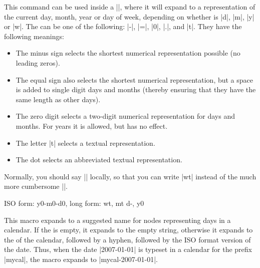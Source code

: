 \begin{command}{\pgfcalendarshorthand{}}
\label{pgfcalendarshorthand}
    This command can be used inside a |\pgfcalendar|, where it will expand to a
    representation of the current day, month, year or day of week, depending on
    whether  is |d|, |m|, |y| or |w|. The  can
    be one of the following: |-|, |=|, |0|, |.|, and |t|. They have the
    following meanings:
    \begin{itemize}
        \item The minus sign selects the shortest numerical representation
            possible (no leading zeros).
        \item The equal sign also selects the shortest numerical
            representation, but a space is added to single digit days and
            months (thereby ensuring that they have the same length as other
            days).
        \item The zero digit selects a two-digit numerical representation for
            days and months. For years it is allowed, but has no effect.
        \item The letter |t| selects a textual representation.
        \item The dot selects an abbreviated textual representation.
    \end{itemize}
    Normally, you should say |\let\%=\pgfcalendarshorthand| locally, so that
    you can write |\%wt| instead of the much more cumbersome
    ||.
\begin{codeexample}
\let\%=\pgfcalendarshorthand
{}
{ ISO form: \%y0-\%m0-\%d0, long form: \%wt, \%mt \%d-, \%y0}
\end{codeexample}
\end{command}

\begin{command}{\pgfcalendarsuggestedname}
    This macro expands to a suggested name for nodes representing days in a
    calendar. If the  is empty, it expands to the empty string,
    otherwise it expands to the  of the calendar, followed by a
    hyphen, followed by the ISO format version of the date. Thus, when the date
    |2007-01-01| is typeset in a calendar for the prefix |mycal|, the macro
    expands to |mycal-2007-01-01|.
\end{command}
